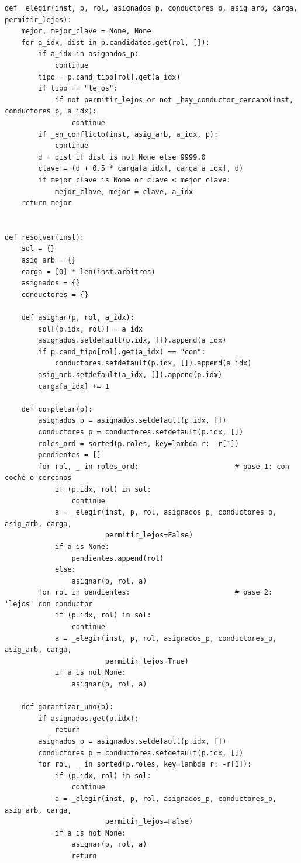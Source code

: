 \documentclass[11pt,a4paper,spanish]{book}
\numberwithin{equation}{chapter}
\numberwithin{figure}{chapter}
\numberwithin{table}{chapter}
\begin{document}
\begin{lstlisting}[caption={\texttt{greedy.py} --- construcción golosa de la solución inicial.}]
def _elegir(inst, p, rol, asignados_p, conductores_p, asig_arb, carga, permitir_lejos):
    mejor, mejor_clave = None, None
    for a_idx, dist in p.candidatos.get(rol, []):
        if a_idx in asignados_p:
            continue
        tipo = p.cand_tipo[rol].get(a_idx)
        if tipo == "lejos":
            if not permitir_lejos or not _hay_conductor_cercano(inst, conductores_p, a_idx):
                continue
        if _en_conflicto(inst, asig_arb, a_idx, p):
            continue
        d = dist if dist is not None else 9999.0
        clave = (d + 0.5 * carga[a_idx], carga[a_idx], d)
        if mejor_clave is None or clave < mejor_clave:
            mejor_clave, mejor = clave, a_idx
    return mejor


def resolver(inst):
    sol = {}
    asig_arb = {}
    carga = [0] * len(inst.arbitros)
    asignados = {}
    conductores = {}

    def asignar(p, rol, a_idx):
        sol[(p.idx, rol)] = a_idx
        asignados.setdefault(p.idx, []).append(a_idx)
        if p.cand_tipo[rol].get(a_idx) == "con":
            conductores.setdefault(p.idx, []).append(a_idx)
        asig_arb.setdefault(a_idx, []).append(p.idx)
        carga[a_idx] += 1

    def completar(p):
        asignados_p = asignados.setdefault(p.idx, [])
        conductores_p = conductores.setdefault(p.idx, [])
        roles_ord = sorted(p.roles, key=lambda r: -r[1])
        pendientes = []
        for rol, _ in roles_ord:                       # pase 1: con coche o cercanos
            if (p.idx, rol) in sol:
                continue
            a = _elegir(inst, p, rol, asignados_p, conductores_p, asig_arb, carga,
                        permitir_lejos=False)
            if a is None:
                pendientes.append(rol)
            else:
                asignar(p, rol, a)
        for rol in pendientes:                         # pase 2: 'lejos' con conductor
            if (p.idx, rol) in sol:
                continue
            a = _elegir(inst, p, rol, asignados_p, conductores_p, asig_arb, carga,
                        permitir_lejos=True)
            if a is not None:
                asignar(p, rol, a)

    def garantizar_uno(p):
        if asignados.get(p.idx):
            return
        asignados_p = asignados.setdefault(p.idx, [])
        conductores_p = conductores.setdefault(p.idx, [])
        for rol, _ in sorted(p.roles, key=lambda r: -r[1]):
            if (p.idx, rol) in sol:
                continue
            a = _elegir(inst, p, rol, asignados_p, conductores_p, asig_arb, carga,
                        permitir_lejos=False)
            if a is not None:
                asignar(p, rol, a)
                return


\end{lstlisting}
\end{document}
